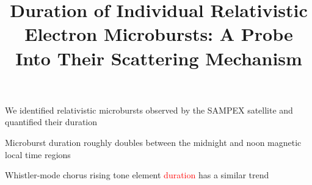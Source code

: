 \documentclass[draft]{agujournal2019}
\begin{document}
%
%



\title{Duration of Individual Relativistic Electron Microbursts: A Probe Into Their Scattering Mechanism}

%
%










\begin{keypoints}
\item We identified relativistic microbursts observed by the SAMPEX satellite and quantified their duration
\item Microburst duration roughly doubles between the midnight and noon magnetic local time regions
\item Whistler-mode chorus rising tone element \textcolor{red}{duration} has  a similar trend
\end{keypoints}
\end{document}
